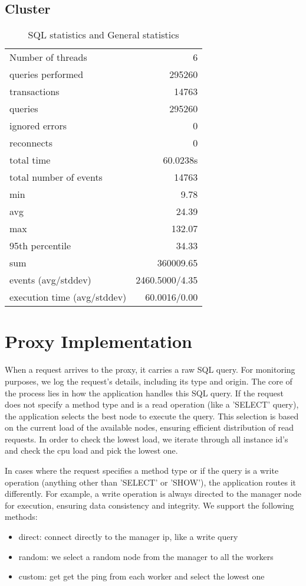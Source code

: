 \documentclass[11pt]{article}
\begin{document}
\subsection{Cluster}

\begin{table}[H]
\centering
\begin{tabular}{ l r }
\hline
Number of threads & 6 \\
queries performed & 295260 \\
transactions & 14763 \\
queries & 295260 \\
ignored errors & 0 \\
reconnects & 0 \\
total time & 60.0238s \\
total number of events & 14763 \\
min & 9.78 \\
avg & 24.39 \\
max & 132.07 \\
95th percentile & 34.33 \\
sum & 360009.65 \\
events (avg/stddev) & 2460.5000/4.35 \\
execution time (avg/stddev) & 60.0016/0.00 \\
\hline
\end{tabular}
\caption{SQL statistics and General statistics}
\label{tab:table1}
\end{table}

\section{Proxy Implementation}

When a request arrives to the proxy, it carries a raw SQL query. For monitoring purposes, we log the request's details, including its type and origin. The core of the process lies in how the application handles this SQL query. If the request does not specify a method type and is a read operation (like a 'SELECT' query), the application selects the best node to execute the query. This selection is based on the current load of the available nodes, ensuring efficient distribution of read requests. In order to check the lowest load, we iterate through all instance id's and check the cpu load and pick the lowest one.
\newline

In cases where the request specifies a method type or if the query is a write operation (anything other than 'SELECT' or 'SHOW'), the application routes it differently. For example, a write operation is always directed to the manager node for execution, ensuring data consistency and integrity. We support the following methods: 
\begin{itemize}
	\item direct: connect directly to the manager ip, like a write query
	\item random: we select a random node from the manager to all the workers
	\item custom: get get the ping from each worker and select the lowest one
\end{itemize}
\newline
\end{document}
